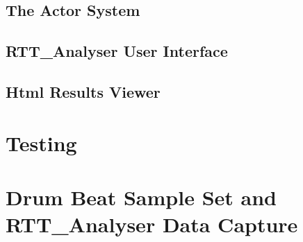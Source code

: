 \documentclass[a4paper, 11pt]{article}
\begin{document}
\subsection{The Actor System}
\subsection{RTT_Analyser User Interface}
\subsection{Html Results Viewer}


\maketitle{}\section{Testing}


\maketitle{}\section{Drum Beat Sample Set and RTT_Analyser Data Capture}
\end{document}
